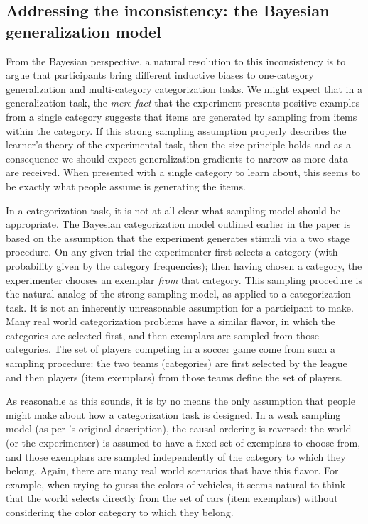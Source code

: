 \documentclass[doc,apacite]{apa6}
\newcommand{\possessivecite}[1]{\citeauthor{#1}'s \citeyear{#1}}
\begin{document}
\subsection{Addressing the inconsistency: the Bayesian generalization model}

From the Bayesian perspective, a natural resolution to this inconsistency is to argue that participants bring different inductive biases to one-category generalization and multi-category categorization tasks. We might expect that in a generalization task, the {\it mere fact} that the experiment presents positive examples from a single category suggests that items are generated by sampling from items within the category. If this strong sampling assumption properly describes the learner's theory of the experimental task, then the size principle holds and as a consequence we should expect generalization gradients to narrow as more data are received. When presented with a single category to learn about, this seems to be exactly what people assume is generating the items.

In a categorization task, it is not at all clear what sampling model should be appropriate. %
The Bayesian categorization model outlined earlier in the paper is based on the assumption that the experiment generates stimuli via a two stage procedure. On any given trial the experimenter first selects a category (with probability given by the category frequencies); then having chosen a category, the experimenter chooses an exemplar {\it from} that category. This sampling procedure is the natural analog of the strong sampling model, as applied to a categorization task. It is not an inherently unreasonable assumption for a participant to make. Many real world categorization problems have a similar flavor, in which the categories are selected first, and then exemplars are sampled from those categories. 
The set of players competing in a soccer game come from such a sampling procedure: the two teams (categories) are first selected by the league and then players (item exemplars) from those teams define the set of players.

As reasonable as this sounds, it is by no means the only assumption that people might make about how a categorization task is designed. In a weak sampling model (as per \possessivecite{shepard1987universalsim} original description), the causal ordering is reversed: the world (or the experimenter) is assumed to have a fixed set of exemplars to choose from, and those exemplars are sampled independently of the category to which they belong. Again, there are many real world scenarios that have this flavor. For example, when trying to guess the colors of vehicles, it seems natural to think that the world selects directly from the set of cars (item exemplars) without considering the color category to which they belong. 
\end{document}
